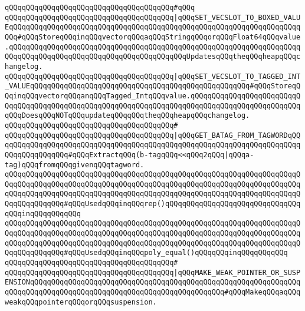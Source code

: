 \verb|qQQqqQQqqQQqqQQqqQQqqQQqqQQqqQQqqQQqqQQq#qQQq|\newline
\verb|qQQqqQQqqQQqqQQqqQQqqQQqqQQqqQQqqQQqqQQq|\verb#|qQQqSET_VECSLOT_TO_BOXED_VALUEqQQqqQQqqQQqqQQqqQQqqQQqqQQqqQQqqQQqqQQqqQQqqQQqqQQqqQQqqQQqqQQqqQQqqQQq#\verb|#qQQqStoreqQQqinqQQqvectorqQQqaqQQqStringqQQqorqQQqFloat64qQQqvalue.qQQqqQQqqQQqqQQqqQQqqQQqqQQqqQQqqQQqqQQqqQQqqQQqqQQqqQQqqQQqqQQqqQQqqQQqqQQqqQQqqQQqqQQqqQQqqQQqqQQqqQQqqQQqqQQqUpdatesqQQqtheqQQqheapqQQqchangelog.|\newline
\verb|qQQqqQQqqQQqqQQqqQQqqQQqqQQqqQQqqQQqqQQq|\verb#|qQQqSET_VECSLOT_TO_TAGGED_INT_VALUEqQQqqQQqqQQqqQQqqQQqqQQqqQQqqQQqqQQqqQQqqQQqqQQqqQQq#\verb|#qQQqStoreqQQqinqQQqvectorqQQqanqQQqTagged_IntqQQqvalue.qQQqqQQqqQQqqQQqqQQqqQQqqQQqqQQqqQQqqQQqqQQqqQQqqQQqqQQqqQQqqQQqqQQqqQQqqQQqqQQqqQQqqQQqqQQqqQQqqQQqDoesqQQqNOTqQQqupdateqQQqqQQqtheqQQqheapqQQqchangelog.|\newline
\verb|qQQqqQQqqQQqqQQqqQQqqQQqqQQqqQQqqQQqqQQq#|\newline
\verb|qQQqqQQqqQQqqQQqqQQqqQQqqQQqqQQqqQQqqQQq|\verb#|qQQqGET_BATAG_FROM_TAGWORDqQQqqQQqqQQqqQQqqQQqqQQqqQQqqQQqqQQqqQQqqQQqqQQqqQQqqQQqqQQqqQQqqQQqqQQqqQQqqQQqqQQqqQQq#\verb|#qQQqExtractqQQq(b-tagqQQq<<qQQq2qQQq|\verb#|qQQqa-tag)qQQqfromqQQqgivenqQQqtagword.#\newline
\verb|qQQqqQQqqQQqqQQqqQQqqQQqqQQqqQQqqQQqqQQqqQQqqQQqqQQqqQQqqQQqqQQqqQQqqQQqqQQqqQQqqQQqqQQqqQQqqQQqqQQqqQQqqQQqqQQqqQQqqQQqqQQqqQQqqQQqqQQqqQQqqQQqqQQqqQQqqQQqqQQqqQQqqQQqqQQqqQQqqQQqqQQqqQQqqQQqqQQqqQQqqQQqqQQqqQQqqQQqqQQqqQQq#qQQqUsedqQQqinqQQqrep()qQQqqQQqqQQqqQQqqQQqqQQqqQQqqQQqqQQqinqQQqqQQqqQQq|\newline
\verb|qQQqqQQqqQQqqQQqqQQqqQQqqQQqqQQqqQQqqQQqqQQqqQQqqQQqqQQqqQQqqQQqqQQqqQQqqQQqqQQqqQQqqQQqqQQqqQQqqQQqqQQqqQQqqQQqqQQqqQQqqQQqqQQqqQQqqQQqqQQqqQQqqQQqqQQqqQQqqQQqqQQqqQQqqQQqqQQqqQQqqQQqqQQqqQQqqQQqqQQqqQQqqQQqqQQqqQQqqQQqqQQq#qQQqUsedqQQqinqQQqpoly_equal()qQQqqQQqinqQQqqQQqqQQq|\newline
\verb|qQQqqQQqqQQqqQQqqQQqqQQqqQQqqQQqqQQqqQQq#|\newline
\verb|qQQqqQQqqQQqqQQqqQQqqQQqqQQqqQQqqQQqqQQq|\verb#|qQQqMAKE_WEAK_POINTER_OR_SUSPENSIONqQQqqQQqqQQqqQQqqQQqqQQqqQQqqQQqqQQqqQQqqQQqqQQqqQQqqQQqqQQqqQQqqQQqqQQqqQQqqQQqqQQqqQQqqQQqqQQqqQQqqQQqqQQqqQQqqQQq#\verb|#qQQqMakeqQQqaqQQqweakqQQqpointerqQQqorqQQqsuspension.|\newline
